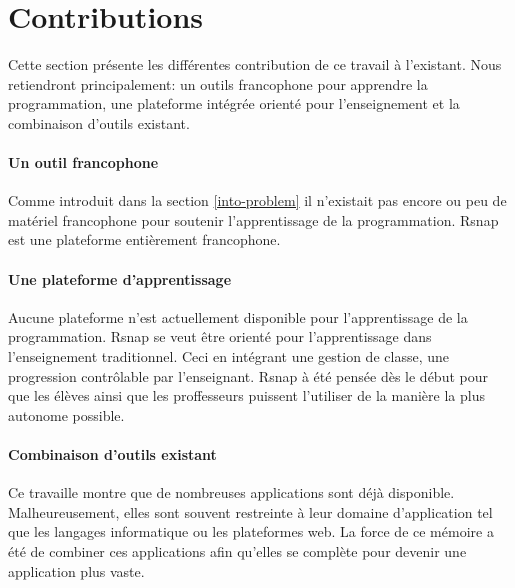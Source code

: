 \section{Contributions}
\label{intro-contribution}
Cette section présente les différentes contribution de ce travail à l'existant. Nous retiendront principalement: un outils francophone pour apprendre la programmation, une plateforme intégrée orienté pour l'enseignement et la combinaison d'outils existant.

\paragraph{Un outil francophone} Comme introduit dans la section \ref{into-problem} il n'existait pas encore ou peu de matériel francophone pour soutenir l'apprentissage de la programmation. \gls{Rsnap} est une plateforme entièrement francophone.%

\paragraph{Une plateforme d'apprentissage} Aucune plateforme n'est actuellement disponible pour l'apprentissage de la programmation. \gls{Rsnap} se veut être orienté pour l'apprentissage dans l'enseignement traditionnel. Ceci en intégrant une gestion de classe, une progression contrôlable par l'enseignant. \gls{Rsnap} à été pensée dès le début pour que les élèves ainsi que les proffesseurs puissent l'utiliser de la manière la plus autonome possible.

\paragraph{Combinaison d'outils existant} Ce travaille montre que de nombreuses applications sont déjà disponible. Malheureusement, elles sont souvent restreinte à leur domaine d'application tel que les langages informatique ou les plateformes web. La force de ce mémoire a été de combiner ces applications afin qu'elles se complète pour devenir une application plus vaste.
